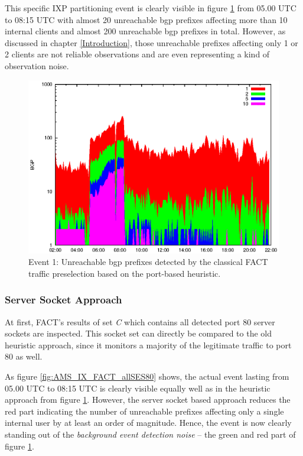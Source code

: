 This specific IXP partitioning event is clearly visible in figure \ref{fig:AMS_IX_FACT_REF} from 05.00 UTC to 08:15 UTC with almost 20 unreachable \gls{bgp} prefixes affecting more than 10 internal clients and almost 200 unreachable \gls{bgp} prefixes in total. 
However, as discussed in chapter \ref{Introduction}, those unreachable prefixes affecting only 1 or 2 clients are not reliable observations and are even representing a kind of observation noise. 
\begin{figure}
	[p] \centering 
	\includegraphics[width=0.75\linewidth]{images/events/2010_03_25/bgp_log_port80_ref.eps} \caption{Event 1: Unreachable \gls{bgp} prefixes detected by the classical \gls{FACT} traffic preselection based on the port-based heuristic.} 
	\label{fig:AMS_IX_FACT_REF} 
\end{figure}

\subsubsection{Server Socket Approach}

At first, \gls{FACT}'s results of set \emph{C} which contains all detected port 80 \glspl{server socket} are inspected. 
This socket set can directly be compared to the old heuristic approach, since it monitors a majority of the legitimate traffic to port 80 as well. 

As figure \ref{fig:AMS_IX_FACT_allSES80} shows, the actual event lasting from 05.00 UTC to 08:15 UTC is clearly visible equally well as in the heuristic approach from figure \ref{fig:AMS_IX_FACT_REF}. 
However, the \gls{server socket} based approach reduces the red part indicating the number of unreachable prefixes affecting only a single internal user by at least an order of magnitude. 
Hence, the event is now clearly standing out of the \emph{background event detection noise} -- the green and red part of figure \ref{fig:AMS_IX_FACT_REF}. 

